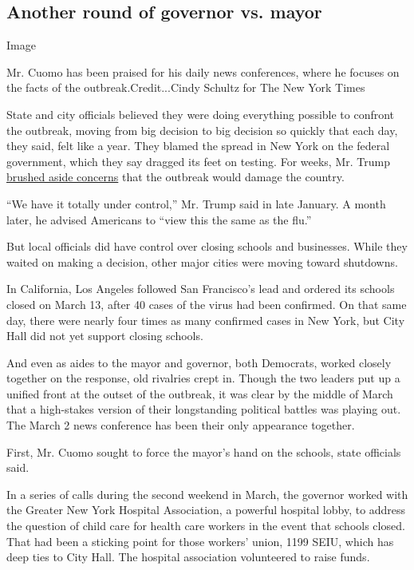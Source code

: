 \hypertarget{another-round-of-governor-vs-mayor}{%
\subsection{Another round of governor vs.
mayor}\label{another-round-of-governor-vs-mayor}}

Image

Mr. Cuomo has been praised for his daily news conferences, where he
focuses on the facts of the outbreak.Credit...Cindy Schultz for The New
York Times

State and city officials believed they were doing everything possible to
confront the outbreak, moving from big decision to big decision so
quickly that each day, they said, felt like a year. They blamed the
spread in New York on the federal government, which they say dragged its
feet on testing. For weeks, Mr. Trump
\href{https://www.nytimes3xbfgragh.onion/video/us/politics/100000007067717/trumps-coronavirus-statements.html}{brushed
aside concerns} that the outbreak would damage the country.

``We have it totally under control,'' Mr. Trump said in late January. A
month later, he advised Americans to ``view this the same as the flu.''

But local officials did have control over closing schools and
businesses. While they waited on making a decision, other major cities
were moving toward shutdowns.

In California, Los Angeles followed San Francisco's lead and ordered its
schools closed on March 13, after 40 cases of the virus had been
confirmed. On that same day, there were nearly four times as many
confirmed cases in New York, but City Hall did not yet support closing
schools.

And even as aides to the mayor and governor, both Democrats, worked
closely together on the response, old rivalries crept in. Though the two
leaders put up a unified front at the outset of the outbreak, it was
clear by the middle of March that a high-stakes version of their
longstanding political battles was playing out. The March 2 news
conference has been their only appearance together.

First, Mr. Cuomo sought to force the mayor's hand on the schools, state
officials said.

In a series of calls during the second weekend in March, the governor
worked with the Greater New York Hospital Association, a powerful
hospital lobby, to address the question of child care for health care
workers in the event that schools closed. That had been a sticking point
for those workers' union, 1199 SEIU, which has deep ties to City Hall.
The hospital association volunteered to raise funds.

